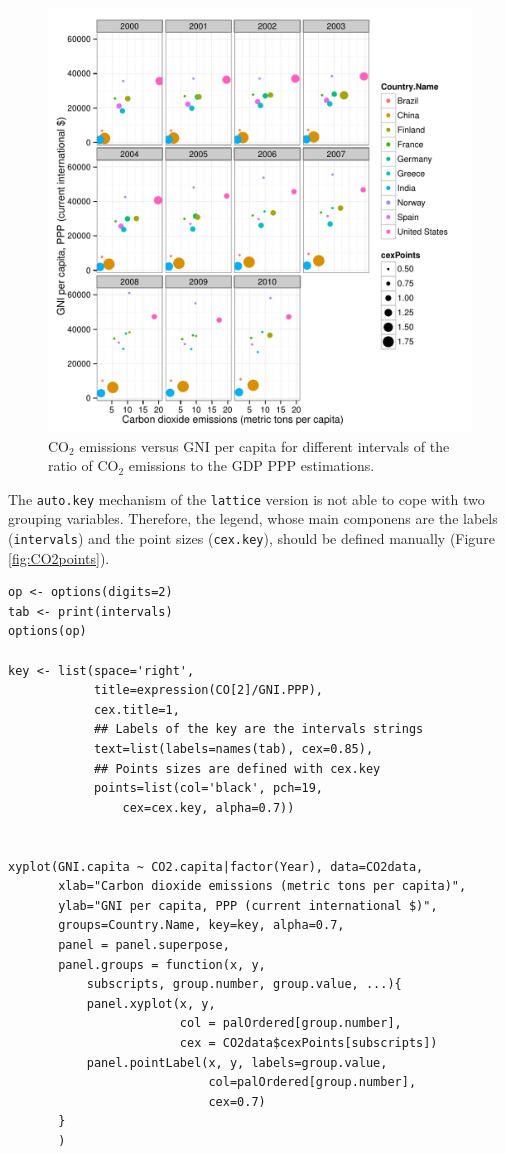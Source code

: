 \documentclass[smallroyalvopaper]{memoir}
\begin{document}
\begin{figure}[htbp]
\centering
\includegraphics[width=.9\linewidth]{figs/CO2pointsGG.pdf}
\caption{\(\mathrm{CO_2}\) emissions versus GNI per capita for different intervals of the ratio of \(\mathrm{CO_2}\) emissions to the GDP PPP estimations. \label{fig:CO2pointsGG}}
\end{figure}

The \texttt{auto.key} mechanism of the \texttt{lattice} version is not able to cope with two grouping variables. Therefore, the legend, whose main componens are the labels (\texttt{intervals}) and the point sizes (\texttt{cex.key}), should be defined manually (Figure \ref{fig:CO2points}). 


\lstset{language=r,label= ,caption= ,captionpos=b,numbers=none}
\begin{lstlisting}
op <- options(digits=2)
tab <- print(intervals)
options(op)
  
key <- list(space='right',
            title=expression(CO[2]/GNI.PPP),
            cex.title=1,
            ## Labels of the key are the intervals strings
            text=list(labels=names(tab), cex=0.85),
            ## Points sizes are defined with cex.key
            points=list(col='black', pch=19,
                cex=cex.key, alpha=0.7))

  
xyplot(GNI.capita ~ CO2.capita|factor(Year), data=CO2data,
       xlab="Carbon dioxide emissions (metric tons per capita)",
       ylab="GNI per capita, PPP (current international $)",
       groups=Country.Name, key=key, alpha=0.7,
       panel = panel.superpose,
       panel.groups = function(x, y,
           subscripts, group.number, group.value, ...){
           panel.xyplot(x, y,
                        col = palOrdered[group.number],
                        cex = CO2data$cexPoints[subscripts])
           panel.pointLabel(x, y, labels=group.value,
                            col=palOrdered[group.number],
                            cex=0.7)
       }
       ) 
\end{lstlisting}
\end{document}
